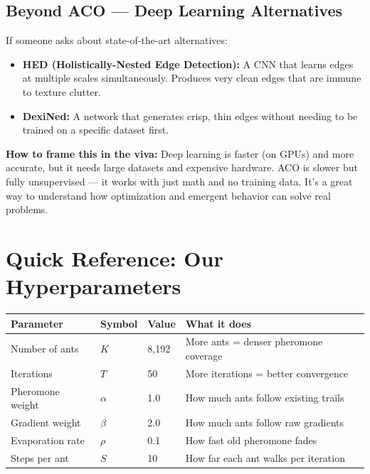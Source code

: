 \documentclass[12pt,a4paper]{article}
\begin{document}
\subsection{Beyond ACO --- Deep Learning Alternatives}
If someone asks about state-of-the-art alternatives:
\begin{itemize}
    \item \textbf{HED (Holistically-Nested Edge Detection):} A CNN that learns edges at multiple scales simultaneously. Produces very clean edges that are immune to texture clutter.
    \item \textbf{DexiNed:} A network that generates crisp, thin edges without needing to be trained on a specific dataset first.
\end{itemize}

\textbf{How to frame this in the viva:} Deep learning is faster (on GPUs) and more accurate, but it needs large datasets and expensive hardware. ACO is slower but fully unsupervised --- it works with just math and no training data. It's a great way to understand how optimization and emergent behavior can solve real problems.

\section{Quick Reference: Our Hyperparameters}

\begin{center}
\begin{tabular}{llll}
\toprule
\textbf{Parameter} & \textbf{Symbol} & \textbf{Value} & \textbf{What it does} \\
\midrule
Number of ants & $K$ & 8{,}192 & More ants = denser pheromone coverage \\
Iterations & $T$ & 50 & More iterations = better convergence \\
Pheromone weight & $\alpha$ & 1.0 & How much ants follow existing trails \\
Gradient weight & $\beta$ & 2.0 & How much ants follow raw gradients \\
Evaporation rate & $\rho$ & 0.1 & How fast old pheromone fades \\
Steps per ant & $S$ & 10 & How far each ant walks per iteration \\
\bottomrule
\end{tabular}
\end{center}
\end{document}

